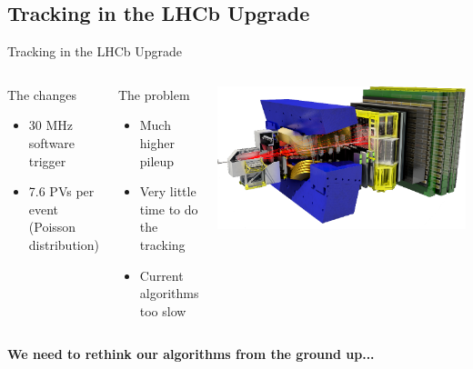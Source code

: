 \subsection{Tracking in the LHCb Upgrade}
\begin{frame}{Tracking in the LHCb Upgrade}
  \begin{columns}[c]
    \begin{block}{The changes}
      \begin{itemize}
          \item 30 MHz software trigger
          \item 7.6 PVs per event (Poisson distribution)
      \end{itemize}
    \end{block}
    \begin{block}{The problem}
    \begin{itemize}
    	\item Much higher pileup
    	\item Very little time to do the tracking
    	\item Current algorithms too slow
    \end{itemize}
    \end{block}
      \begin{center}
    \includegraphics[width=\textwidth, trim=18 0 18 0]{images/LHCbDet.png}
  \end{center}
  \end{columns}
  
  \vspace{1em}
  \begin{center}
    \textbf{We need to rethink our algorithms from the ground up...}
  \end{center}
\end{frame}

